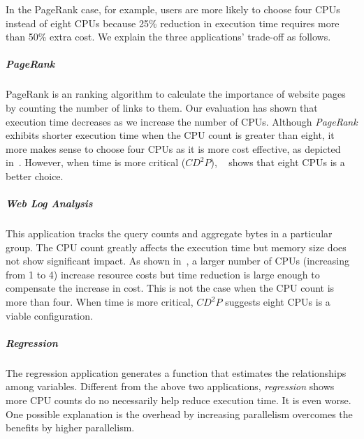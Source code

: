 


In the PageRank case, for example,
users are more likely to choose four CPUs instead of eight CPUs because
25\% reduction in execution time requires
more than 50\% extra cost.
We explain the three applications' trade-off as follows.

\subparagraph*{PageRank}

PageRank is an ranking algorithm to calculate the importance of website pages
by counting the number of links to them.
Our evaluation has shown that execution time decreases as
we increase the number of CPUs.
Although \emph{PageRank} exhibits shorter execution time
when the CPU count is greater than eight,
it more makes sense to choose four CPUs as it is more cost effective,
as depicted in~\myfigure{\ref{fig:pagerank_cost}}.
However, when time is more critical ($CD^2P$),
~\myfigure{\ref{fig:pagerank_time}} shows that
eight CPUs is a better choice.

\subparagraph*{Web Log Analysis}
This application tracks the query counts and aggregate bytes in a particular group.
The CPU count greatly affects the execution time but memory size does not
show significant impact.
As shown in~\myfigure{\ref{fig:webloganalysis_time}}, a larger number of CPUs (increasing from 1 to 4)
increase resource costs but time reduction is large enough
to compensate the increase in cost.
This is not the case when the CPU count is more than four.
When time is more critical, $CD^2P$ suggests eight CPUs is a viable configuration.

\subparagraph*{Regression}
The regression application generates a function that estimates 
the relationships among variables.
Different from the above two applications, \emph{regression} shows
more CPU counts do no necessarily help reduce execution time.
It is even worse.
One possible explanation is the overhead by increasing parallelism overcomes
the benefits by higher parallelism.

